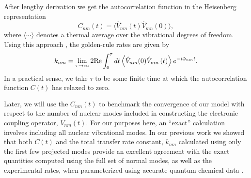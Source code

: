 After lengthy derivation we get the autocorrelation function in the Heisenberg representation
$$
C_{nm}(t) =\langle \hat V_{nm}(t) \hat V_{mn}(0)\rangle,\label{cor-fun}
$$
where $\langle \cdots \rangle$ denotes a thermal average over the
vibrational degrees of freedom.
Using this approach , the golden-rule rates are given by
\begin{eqnarray}
k_{nm}=\lim_{\tau \to \infty}2{\rm Re}\int_{0}^{\tau}dt\left\langle \hat V_{nm}(0)\hat V_{mn}\left(t\right)\right\rangle e^{-i\tilde\omega_{nm}t}.
\end{eqnarray}
In a practical sense, we take $\tau$ to be some finite time at which the
autocorrelation function $C(t)$
has relaxed to zero.

Later, we will use the $C_{nm}(t) $ to benchmark the convergence of our model with respect to
the number of nuclear modes included in constructing the electronic coupling operator, $V_{nm}(t)$.
For our purposes here,  an ``exact''  calculation involves including all nuclear vibrational modes.
In our previous work we showed that both $C(t)$
and the total transfer rate constant, $k_{nm}$ calculated using only the first few projected modes provide an
excellent agreement with the exact quantities computed using  the full set of
normal modes, as well as the experimental rates,
when parameterized using accurate quantum chemical data \cite{yang2014intramolecular}.





